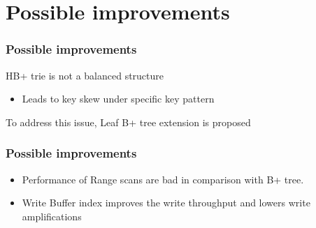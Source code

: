 \documentclass[aspectratio=169]{beamer}
\begin{document}
\section{Possible improvements}
\begin{frame}[t]
    \frametitle{Possible improvements}
    HB+ trie is not a balanced structure
    \begin{itemize}
    	\item Leads to key skew under specific key pattern
    \end{itemize}

	To address this issue, Leaf B+ tree extension is proposed
	\begin{figure}%
		\centering
		\qquad
	\end{figure}
\end{frame}
\begin{frame}[t]
	\frametitle{Possible improvements}
	\begin{itemize}
		\item Performance of Range scans are bad in comparison with B+ tree.
		\item Write Buffer index improves the write throughput and lowers write amplifications
	\end{itemize}
	
\end{frame}
\end{document}
